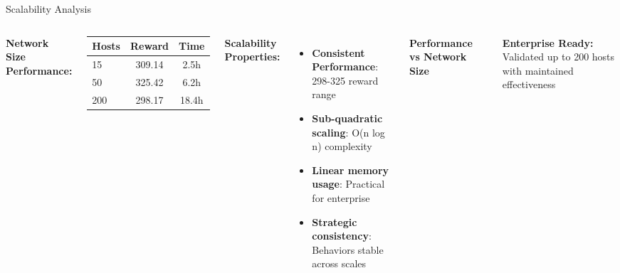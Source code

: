 \documentclass[aspectratio=169,xcolor=dvipsnames]{beamer}
\begin{document}
\begin{frame}{Scalability Analysis}
\begin{columns}[c]
\textbf{\textcolor{ImperialBlue}{Network Size Performance:}}

\begin{center}
\begin{tabular}{|l|c|c|}
\hline
\rowcolor{ImperialLightBlue}
\textbf{Hosts} & \textbf{Reward} & \textbf{Time} \\
\hline
15 & 309.14 & 2.5h \\
50 & 325.42 & 6.2h \\
200 & 298.17 & 18.4h \\
\hline
\end{tabular}
\end{center}

\textbf{\textcolor{cwDecoy}{Scalability Properties:}}
\begin{itemize}
    \item \textbf{Consistent Performance}: 298-325 reward range
    \item \textbf{Sub-quadratic scaling}: O(n log n) complexity
    \item \textbf{Linear memory usage}: Practical for enterprise
    \item \textbf{Strategic consistency}: Behaviors stable across scales
\end{itemize}

\textbf{Performance vs Network Size}

\begin{center}
\end{center}

\textbf{\textcolor{cwAlert}{Enterprise Ready:}} Validated up to 200 hosts with maintained effectiveness
\end{columns}
\end{frame}
\end{document}
